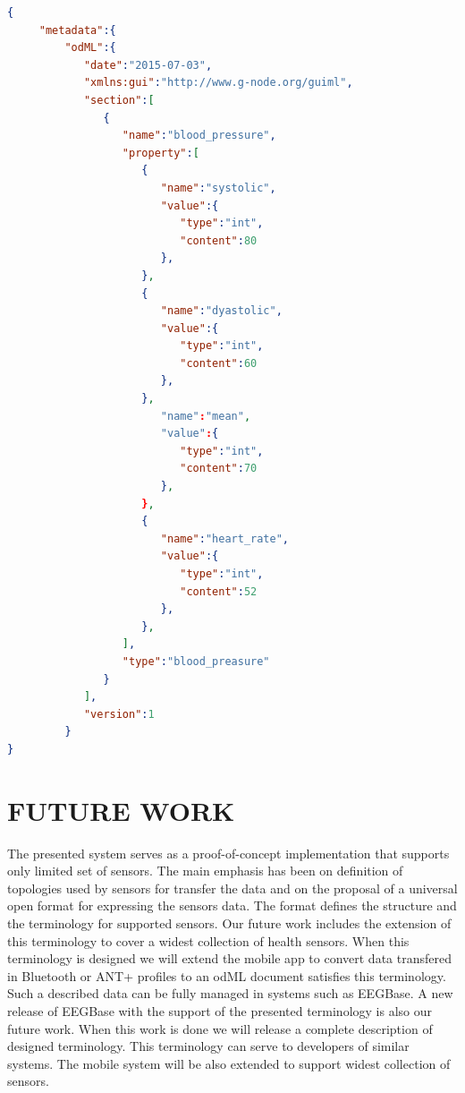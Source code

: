 \documentclass[a4paper,twoside]{article}
\begin{document}
\begin{lstlisting}[language=json,caption=blood preasure examle, label=odml_example]
{
     "metadata":{
         "odML":{
            "date":"2015-07-03",
            "xmlns:gui":"http://www.g-node.org/guiml",
            "section":[
               {
                  "name":"blood_pressure",
                  "property":[
                     {
                        "name":"systolic",
                        "value":{
                           "type":"int",
                           "content":80
                        },
                     },
                     {
                        "name":"dyastolic",
                        "value":{
                           "type":"int",
                           "content":60
                        },
                     },
                        "name":"mean",
                        "value":{
                           "type":"int",
                           "content":70
                        },
                     },
                     {
                        "name":"heart_rate",
                        "value":{
                           "type":"int",
                           "content":52
                        },
                     },
                  ],
                  "type":"blood_preasure"
               }
            ],
            "version":1
         }
}
\end{lstlisting}


\section{\uppercase{Future Work}}
\label{future-work}
\noindent
The presented system serves as a proof-of-concept implementation that supports only limited set of sensors. The main emphasis has been on definition of topologies used by sensors for transfer the data and on the proposal of a universal open format for expressing the sensors data. The format defines the structure and the terminology for supported sensors. Our future work includes the extension of this terminology to cover a widest collection of health sensors. When this terminology is designed we will extend the mobile app to convert data transfered in Bluetooth or ANT+ profiles to an odML document satisfies this terminology. Such a described data can be fully managed in systems such as EEGBase. A new release of EEGBase with the support of the presented terminology is also our future work. When this work is done we will release a complete description of designed terminology. This terminology can serve to developers of similar systems. The mobile system will be also extended to support widest collection of sensors.
\end{document}
